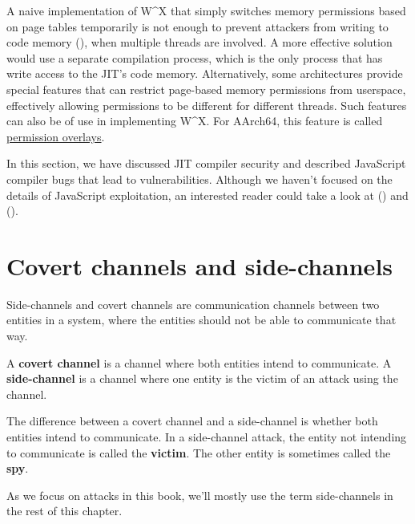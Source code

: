 \documentclass[
  a4paper,
]{report}
\begin{document}
\begin{enumerate}
  A naive implementation of W\^{}X that simply switches memory
  permissions based on page tables temporarily is not enough to prevent
  attackers from writing to code memory (), when multiple threads are involved. A more effective
  solution would use a separate compilation process, which is the only
  process that has write access to the JIT's code memory. Alternatively,
  some architectures provide special features that can restrict
  page-based memory permissions from userspace, effectively allowing
  permissions to be different for different threads. Such features can
  also be of use in implementing W\^{}X. For AArch64, this feature is
  called
  \href{https://developer.arm.com/documentation/102376/0200/Permission-indirection-and-permission-overlay-extensions}{permission
  overlays}.
\end{enumerate}

In this section, we have discussed JIT compiler security and described
JavaScript compiler bugs that lead to vulnerabilities. Although we
haven't focused on the details of JavaScript exploitation, an interested
reader could take a look at () and
().

\chapter{Covert channels and
side-channels}\label{covert-channels-and-side-channels}

Side-channels and covert channels are communication channels between two
entities in a system, where the entities should not be able to
communicate that way.

A \textbf{\label{__index_entry_100}{covert
channel}} is a channel where both entities intend
to communicate. A
\textbf{\label{__index_entry_101}{side-channel}}
is a channel where one entity is the victim of an attack using the
channel.

The difference between a covert channel and a side-channel is whether
both entities intend to communicate. In a side-channel attack, the
entity not intending to communicate is called the
\textbf{\label{__index_entry_102}{victim}}.
The other entity is sometimes called the
\textbf{\label{__index_entry_103}{spy}}.

As we focus on attacks in this book, we'll mostly use the term
side-channels in the rest of this chapter.
\end{document}
